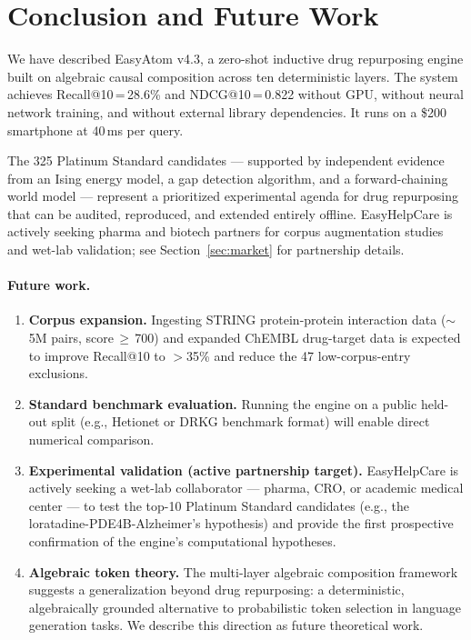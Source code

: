 \documentclass[11pt]{article}
\begin{document}
\section{Conclusion and Future Work}
\label{sec:conclusion}

We have described EasyAtom v4.3, a zero-shot inductive drug repurposing
engine built on algebraic causal composition across ten deterministic layers.
The system achieves Recall@10\,=\,28.6\% and NDCG@10\,=\,0.822
without GPU, without neural network training, and without external
library dependencies.
It runs on a \$200 smartphone at 40\,ms per query.

The 325 Platinum Standard candidates --- supported by independent evidence
from an Ising energy model, a gap detection algorithm, and a
forward-chaining world model --- represent a prioritized experimental
agenda for drug repurposing that can be audited, reproduced, and
extended entirely offline.
EasyHelpCare is actively seeking pharma and biotech partners for
corpus augmentation studies and wet-lab validation;
see Section~\ref{sec:market} for partnership details.

\paragraph{Future work.}
\begin{enumerate}[noitemsep]
  \item \textbf{Corpus expansion.}
    Ingesting STRING protein-protein interaction data (${\sim}$5M pairs,
    score\,$\geq$\,700) and expanded ChEMBL drug-target data is expected to
    improve Recall@10 to $>$35\% and reduce the 47 low-corpus-entry
    exclusions.
  \item \textbf{Standard benchmark evaluation.}
    Running the engine on a public held-out split (e.g., Hetionet or
    DRKG benchmark format) will enable direct numerical comparison.
  \item \textbf{Experimental validation (active partnership target).}
    EasyHelpCare is actively seeking a wet-lab collaborator --- pharma,
    CRO, or academic medical center --- to test the top-10 Platinum
    Standard candidates (e.g., the loratadine-PDE4B-Alzheimer's
    hypothesis) and provide the first prospective confirmation of
    the engine's computational hypotheses.
  \item \textbf{Algebraic token theory.}
    The multi-layer algebraic composition framework suggests a
    generalization beyond drug repurposing: a deterministic,
    algebraically grounded alternative to probabilistic token
    selection in language generation tasks.
    We describe this direction as future theoretical work.
\end{enumerate}
\end{document}
